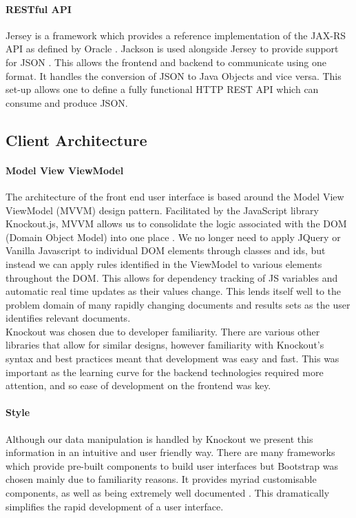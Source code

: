 \documentclass{l4proj}
\begin{document}
\paragraph{RESTful API}
Jersey is a framework which provides a reference implementation of the JAX-RS API as defined by Oracle \cite{jersey} \cite{jaxrsapi}.
Jackson is used alongside Jersey to provide support for JSON \cite{jackson}. This allows the frontend and backend to communicate using one format. It handles the conversion of JSON to Java Objects and vice versa.
This set-up allows one to define a fully functional HTTP REST API which can consume and produce JSON.

\subsection{Client Architecture}
\paragraph{Model View ViewModel}
The architecture of the front end user interface is based around the Model View ViewModel (MVVM) design pattern. Facilitated by the JavaScript library Knockout.js, MVVM allows us to consolidate the logic associated with the DOM (Domain Object Model) into one place \cite{knockout}.
We no longer need to apply JQuery or Vanilla Javascript to individual DOM elements through classes and ids, but instead we can apply rules identified in the ViewModel to various elements throughout the DOM. This allows for dependency tracking of JS variables and automatic real time updates as their values change.
This lends itself well to the problem domain of many rapidly changing documents and results sets as the user identifies relevant documents. \\
Knockout was chosen due to developer familiarity. There are various other libraries that allow for similar designs, however familiarity with Knockout's syntax and best practices meant that development was easy and fast.
This was important as the learning curve for the backend technologies required more attention, and so ease of development on the frontend was key.

\paragraph{Style}
Although our data manipulation is handled by Knockout we present this information in an intuitive and user friendly way. There are many frameworks which provide pre-built components to build user interfaces but Bootstrap was chosen mainly due to familiarity reasons. It provides myriad customisable components, as well as being extremely well documented \cite{bootstrap}. This dramatically simplifies the rapid development of a user interface.
\end{document}
